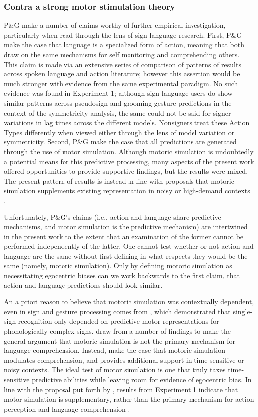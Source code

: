         \subsubsection{Contra a strong motor stimulation theory}
            P\&G make a number of claims worthy of further empirical investigation, particularly when read through the lens of sign language research. First, P\&G make the case that language is a specialized form of action, meaning that both draw on the same mechanisms for self monitoring and comprehending others. This claim is made via an extensive series of comparison of patterns of results across spoken language and action literature; however this assertion would be much stronger with evidence from the same experimental paradigm. No such evidence was found in Experiment 1; although sign language users do show similar patterns across pseudosign and grooming gesture predictions in the context of the symmetricity analysis, the same could not be said for signer variations in lag times across the different models. Nonsigners treat these Action Types differently when viewed either through the lens of model variation or symmetricity. Second, P\&G make the case that all predictions are generated through the use of motor simulation. Although motoric simulation is undoubtedly a potential means for this predictive processing, many aspects of the present work offered opportunities to provide supportive findings, but the results were mixed. The present pattern of results is instead in line with proposals that motoric simulation supplements existing representation in noisy or high-demand contexts \cite{hickok2011}. \par
            Unfortunately, P\&G’s claims (i.e., action and language share predictive mechanisms, and motor simulation is the predictive mechanism) are intertwined in the present work to the extent that an examination of the former cannot be performed independently of the latter. One cannot test whether or not action and language are the same without first defining in what respects they would be the same (namely, motoric simulation). Only by defining motoric simulation as necessitating egocentric biases can we work backwards to the first claim, that action and language predictions should look similar. \par
            An a priori reason to believe that motoric simulation was contextually dependent, even in sign and gesture processing comes from , which demonstrated that single-sign recognition only depended on predictive motor representations for phonologically complex signs.  draw from a number of findings to make the general argument that motoric simulation is not the primary mechanism for language comprehension. Instead,  make the case that motoric simulation modulates comprehension, and provides additional support in time-sensitive or noisy contexts. The ideal test of motor simulation is one that truly taxes time-sensitive predictive abilities while leaving room for evidence of egocentric bias. In line with the proposal put forth by , results from Experiment 1 indicate that motor simulation is supplementary, rather than the primary mechanism for action perception and language comprehension \cite{PG}. \par

